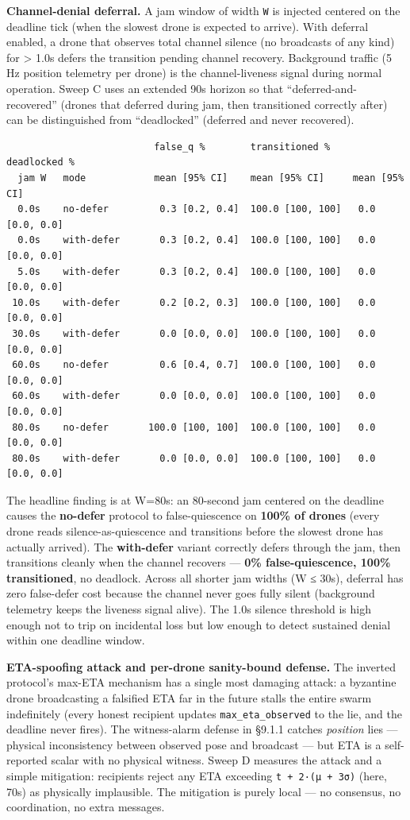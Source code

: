 \textbf{Channel-denial deferral.} A jam window of width \texttt{W} is
injected centered on the deadline tick (when the slowest drone is
expected to arrive). With deferral enabled, a drone that observes total
channel silence (no broadcasts of any kind) for \textgreater{} 1.0s
defers the transition pending channel recovery. Background traffic (5 Hz
position telemetry per drone) is the channel-liveness signal during
normal operation. Sweep C uses an extended 90s horizon so that
``deferred-and-recovered'' (drones that deferred during jam, then
transitioned correctly after) can be distinguished from ``deadlocked''
(deferred and never recovered).

\begin{verbatim}
                          false_q %        transitioned %    deadlocked %
  jam W   mode            mean [95% CI]    mean [95% CI]     mean [95% CI]
  0.0s    no-defer         0.3 [0.2, 0.4]  100.0 [100, 100]   0.0 [0.0, 0.0]
  0.0s    with-defer       0.3 [0.2, 0.4]  100.0 [100, 100]   0.0 [0.0, 0.0]
  5.0s    with-defer       0.3 [0.2, 0.4]  100.0 [100, 100]   0.0 [0.0, 0.0]
 10.0s    with-defer       0.2 [0.2, 0.3]  100.0 [100, 100]   0.0 [0.0, 0.0]
 30.0s    with-defer       0.0 [0.0, 0.0]  100.0 [100, 100]   0.0 [0.0, 0.0]
 60.0s    no-defer         0.6 [0.4, 0.7]  100.0 [100, 100]   0.0 [0.0, 0.0]
 60.0s    with-defer       0.0 [0.0, 0.0]  100.0 [100, 100]   0.0 [0.0, 0.0]
 80.0s    no-defer       100.0 [100, 100]  100.0 [100, 100]   0.0 [0.0, 0.0]
 80.0s    with-defer       0.0 [0.0, 0.0]  100.0 [100, 100]   0.0 [0.0, 0.0]
\end{verbatim}

The headline finding is at W=80s: an 80-second jam centered on the
deadline causes the \textbf{no-defer} protocol to false-quiescence on
\textbf{100\% of drones} (every drone reads silence-as-quiescence and
transitions before the slowest drone has actually arrived). The
\textbf{with-defer} variant correctly defers through the jam, then
transitions cleanly when the channel recovers --- \textbf{0\%
false-quiescence, 100\% transitioned}, no deadlock. Across all shorter
jam widths (W ≤ 30s), deferral has zero false-defer cost because the
channel never goes fully silent (background telemetry keeps the liveness
signal alive). The 1.0s silence threshold is high enough not to trip on
incidental loss but low enough to detect sustained denial within one
deadline window.

\textbf{ETA-spoofing attack and per-drone sanity-bound defense.} The
inverted protocol's max-ETA mechanism has a single most damaging attack:
a byzantine drone broadcasting a falsified ETA far in the future stalls
the entire swarm indefinitely (every honest recipient updates
\texttt{max\_eta\_observed} to the lie, and the deadline never fires).
The witness-alarm defense in §9.1.1 catches \emph{position} lies ---
physical inconsistency between observed pose and broadcast --- but ETA
is a self-reported scalar with no physical witness. Sweep D measures the
attack and a simple mitigation: recipients reject any ETA exceeding
\texttt{t\ +\ 2·(μ\ +\ 3σ)} (here, 70s) as physically implausible. The
mitigation is purely local --- no consensus, no coordination, no extra
messages.

